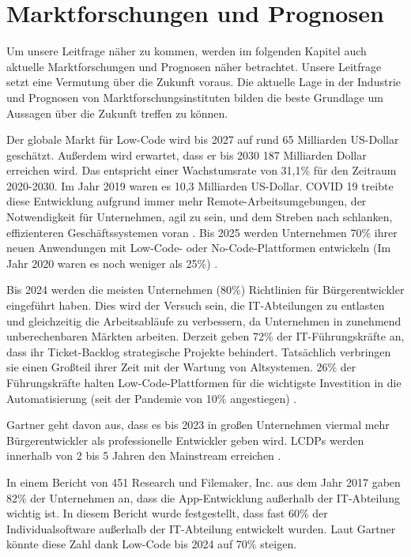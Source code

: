 \documentclass[12pt]{article} %
\begin{document}
	\section{Marktforschungen und Prognosen}
	Um unsere Leitfrage näher zu kommen, werden im folgenden Kapitel auch aktuelle Marktforschungen und Prognosen näher betrachtet. Unsere Leitfrage setzt eine Vermutung über die Zukunft voraus. Die aktuelle Lage in der Industrie und Prognosen von Marktforschungsinstituten bilden die beste Grundlage um Aussagen über die Zukunft treffen zu können. 

	Der globale Markt für Low-Code wird bis 2027 auf rund 65 Milliarden US-Dollar geschätzt. Außerdem wird erwartet, dass er bis 2030 187 Milliarden Dollar erreichen wird. Das entspricht einer Wachstumsrate von 31,1\% für den Zeitraum 2020-2030.
	Im Jahr 2019 waren es 10,3 Milliarden US-Dollar. COVID 19 treibte diese Entwicklung aufgrund immer mehr Remote-Arbeitsumgebungen, der Notwendigkeit für Unternehmen, agil zu sein, und dem Streben nach schlanken, effizienteren Geschäftssystemen voran \cite{KevinShuler.2023}.
	Bis 2025 werden Unternehmen 70\% ihrer neuen Anwendungen mit Low-Code- oder No-Code-Plattformen entwickeln (Im Jahr 2020 waren es noch weniger als 25\%) \cite{KevinShuler.2023}. 
	
	Bis 2024 werden die meisten Unternehmen (80\%) Richtlinien für Bürgerentwickler eingeführt haben. Dies wird der Versuch sein, die IT-Abteilungen zu entlasten und gleichzeitig die Arbeitsabläufe zu verbessern, da Unternehmen in zunehmend unberechenbaren Märkten arbeiten. 	
	Derzeit geben 72\% der IT-Führungskräfte an, dass ihr Ticket-Backlog strategische Projekte behindert. Tatsächlich verbringen sie einen Großteil ihrer Zeit mit der Wartung von Altsystemen.	26\% der Führungskräfte halten Low-Code-Plattformen für die wichtigste Investition in die Automatisierung (seit der Pandemie von 10\% angestiegen) \cite{KevinShuler.2023}.
	
	Gartner geht davon aus, dass es bis 2023 in großen Unternehmen viermal mehr Bürgerentwickler als professionelle Entwickler geben wird. LCDPs werden innerhalb von 2 bis 5 Jahren den Mainstream erreichen \cite{KevinShuler.2023}.
	
	In einem Bericht von 451 Research und Filemaker, Inc. aus dem Jahr 2017 gaben 82\% der Unternehmen an, dass die App-Entwicklung außerhalb der IT-Abteilung wichtig ist. In diesem Bericht wurde festgestellt, dass fast 60\% der Individualsoftware außerhalb der IT-Abteilung entwickelt wurden. Laut Gartner könnte diese Zahl dank Low-Code bis 2024 auf 70\% steigen. 
	
\end{document}
